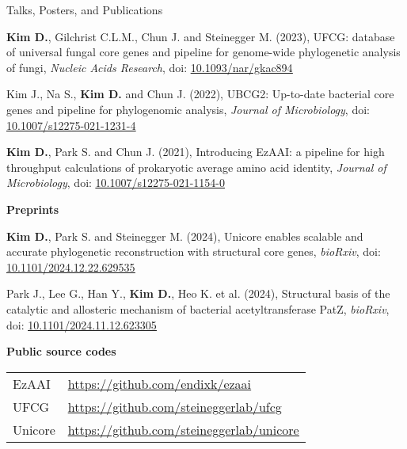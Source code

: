 \documentclass{resume} %
\renewcommand{\url}[1]{\uline{\href{#1}{#1}}}
\newcommand{\uhref}[2]{\href{#1}{\uline{#2}}}
\newcommand{\doi}[1]{\uhref{https://doi.org/#1}{#1}}
\newcommand{\subheading}[1]{%
  \vspace{0.5mm}%
  {\fontsize{11.5pt}{13pt}\selectfont\bfseries #1}%
  \vspace{1mm}%
}
\begin{document}
\begin{rSection}{Talks, Posters, and Publications}
\begin{thebibliography}{10}
{\bf Kim D.}, Gilchrist C.L.M., Chun J. and Steinegger M. (2023),
UFCG: database of universal fungal core genes and pipeline for genome-wide phylogenetic analysis of fungi, {\em Nucleic Acids Research}, doi: \doi{10.1093/nar/gkac894}

Kim J., Na S., {\bf Kim D.} and Chun J.  (2022), 
UBCG2: Up-to-date bacterial core genes and pipeline for phylogenomic analysis, {\em Journal of Microbiology}, doi: \doi{10.1007/s12275-021-1231-4}

{\bf Kim D.}, Park S. and Chun J. (2021),
Introducing EzAAI: a pipeline for high throughput calculations of prokaryotic average amino acid identity, {\em Journal of Microbiology}, doi: \doi{10.1007/s12275-021-1154-0}

\end{thebibliography}
\vspace{4mm}

\subheading{Preprints}\\[-26mm]

\begin{thebibliography}{10}

\vspace{8mm}
{\bf Kim D.}, Park S. and Steinegger M. (2024),
Unicore enables scalable and accurate phylogenetic reconstruction with structural core genes, {\em bioRxiv}, doi: \doi{10.1101/2024.12.22.629535}

Park J., Lee G., Han Y., {\bf Kim D.}, Heo K. et al. (2024),
Structural basis of the catalytic and allosteric mechanism of bacterial acetyltransferase PatZ, {\em bioRxiv}, doi: \doi{10.1101/2024.11.12.623305}

\end{thebibliography}
\vspace{4mm}

\subheading{Public source codes}

\begin{tabular}{p{2.5cm}p{14.1cm}}
EzAAI  & \url{https://github.com/endixk/ezaai} \\[1.mm]
UFCG  & \url{https://github.com/steineggerlab/ufcg} \\[1.mm]
Unicore &  \url{https://github.com/steineggerlab/unicore} \\[1.mm]
\end{tabular}
\vspace{2mm}

\end{rSection}
\end{document}
